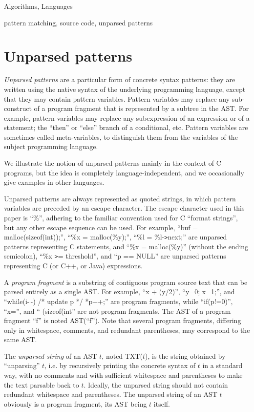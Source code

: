\documentclass{sigplanconf}
\begin{document}

\terms Algorithms, Languages

\keywords
pattern matching, source code, unparsed patterns



\section{Unparsed patterns}
\label{defs}
{\em Unparsed patterns} are a particular form of concrete syntax
patterns: they are written using the native syntax of the underlying
programming language, except that they may contain pattern
variables. Pattern variables may replace any sub-construct of a
program fragment that is represented by a subtree in the AST. For
example, pattern variables may replace any subexpression of an
expression or of a statement; the ``then'' or ``else'' branch of a
conditional, etc. Pattern variables are sometimes called
meta-variables, to distinguish them from the variables of the subject
programming language.

We illustrate the notion of unparsed patterns mainly in the context of
C programs, but the idea is completely language-independent, and we
occasionally give examples in other languages.

Unparsed patterns are always represented as quoted strings, in which
pattern variables are preceded by an escape character. The escape
character used in this paper is ``\%'', adhering to the familiar
convention used for C ``format strings'', but any other escape
sequence can be used. For example, ``buf = malloc(sizeof(int));'',
``\%x = malloc(\%y);'', ``\%l = \%l-\verb.>.next;'' are unparsed
patterns representing C statements, and ``\%x = malloc(\%y)'' (without
the ending semicolon), ``\%x \verb.>.= threshold'', and ``p == NULL''
are unparsed patterns representing C (or C++, or Java) expressions.

A {\em program fragment} is a substring of contiguous program source
text that can be parsed entirely as a single AST. For example, ``x +
(y/2)'', ``y=0; x=1;'', and ``while(i-\,-) /* update p */ *p++;'' are
program fragments, while ``if(p!=0)'', ``x='', and `` (sizeof(int''
are not program fragments. The AST of a program fragment ``f'' is
noted AST(``f''). Note that several program fragments, differing only
in whitespace, comments, and redundant parentheses, may correspond to
the same AST.

The {\em unparsed string} of an AST $t$, noted TXT($t$), is the string
obtained by ``unparsing'' $t$, i.e. by recursively printing the
concrete syntax of $t$ in a standard way, with no comments and with
sufficient whitespace and parentheses to make the text parsable back
to $t$. Ideally, the unparsed string should not contain redundant
whitespace and parentheses. The unparsed string of an AST $t$
obviously is a program fragment, its AST being $t$ itself.
\end{document}
